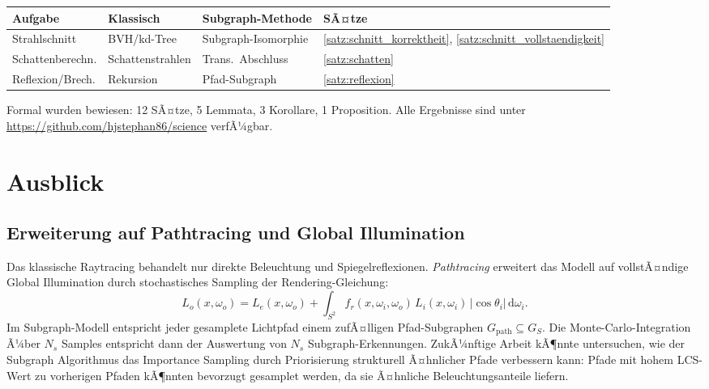﻿\documentclass[a4paper,12pt]{article}
\theoremstyle{definition}
\begin{document}
\begin{center}
\begin{tabular}{@{}llll@{}}
  \toprule
  Aufgabe & Klassisch & Subgraph-Methode & SÃ¤tze \\
  \midrule
  Strahlschnitt   & BVH/kd-Tree     & Subgraph-Isomorphie    & \ref{satz:schnitt_korrektheit}, \ref{satz:schnitt_vollstaendigkeit} \\
  Schattenberechn. & Schattenstrahlen & Trans.\ Abschluss     & \ref{satz:schatten} \\
  Reflexion/Brech. & Rekursion       & Pfad-Subgraph          & \ref{satz:reflexion} \\
  \bottomrule
\end{tabular}
\end{center}

Formal wurden bewiesen: 12 SÃ¤tze, 5 Lemmata, 3 Korollare,
1 Proposition. Alle Ergebnisse sind unter
\url{https://github.com/hjstephan86/science} verfÃ¼gbar.

\section{Ausblick}

\subsection{Erweiterung auf Pathtracing und Global Illumination}

Das klassische Raytracing behandelt nur direkte Beleuchtung und
Spiegelreflexionen. \emph{Pathtracing} \citep{Kajiya1986} erweitert
das Modell auf vollstÃ¤ndige Global Illumination durch stochastisches
Sampling der Rendering-Gleichung:
\[
  L_o(x, \omega_o) = L_e(x, \omega_o) + \int_{S^2}
  f_r(x, \omega_i, \omega_o)\,L_i(x, \omega_i)\,
  |\cos\theta_i|\,\mathrm{d}\omega_i.
\]
Im Subgraph-Modell entspricht jeder gesamplete Lichtpfad einem
zufÃ¤lligen Pfad-Subgraphen $G_{\mathrm{path}} \subseteq G_S$.
Die Monte-Carlo-Integration Ã¼ber $N_s$ Samples entspricht dann
der Auswertung von $N_s$ Subgraph-Erkennungen. ZukÃ¼nftige Arbeit
kÃ¶nnte untersuchen, wie der Subgraph Algorithmus das Importance
Sampling durch Priorisierung strukturell Ã¤hnlicher Pfade verbessern
kann: Pfade mit hohem LCS-Wert zu vorherigen Pfaden kÃ¶nnten bevorzugt
gesamplet werden, da sie Ã¤hnliche Beleuchtungsanteile liefern.
\end{document}
